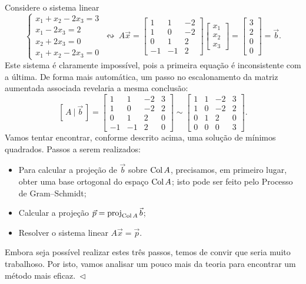 \documentclass[../livro.tex]{subfiles}  %
\begin{document}
\begin{example}\label{exp:minquad1}
  Considere o sistema linear
  \[
  \left\{
    \begin{array}{ll}
      x_1 + x_2 - 2x_3 = 3 \\
      x_1  - 2x_3 = 2 \\
      x_2 + 2x_3 = 0 \\
      x_1 + x_2 - 2x_3 = 0
    \end{array}
  \right. \ \leftrightsquigarrow  \
  A \vec{x} = \begin{bmatrix}
    1 & 1 & -2 \\ 1 & 0 & -2 \\ 0 & 1 & 2 \\ -1 & -1 & 2
  \end{bmatrix}
  \begin{bmatrix}
    x_1 \\ x_2 \\ x_3
  \end{bmatrix} =
  \begin{bmatrix}
    3 \\ 2 \\ 0 \\ 0
  \end{bmatrix} = \vec{b}.
  \] Este sistema é claramente impossível, pois a primeira equação é inconsistente com a última. De forma mais automática, um passo no escalonamento da matriz aumentada associada revelaria a mesma conclusão:
  \[
  [\, A \ | \ \vec{b} \, ] = \begin{bmatrix}
    1 & 1 & -2 & 3 \\ 1 & 0 & -2 & 2 \\ 0 & 1 & 2 & 0 \\ -1 & -1 & 2 & 0
  \end{bmatrix}   \sim
  \begin{bmatrix}
    1 & 1 & -2 & 3 \\ 1 & 0 & -2 & 2 \\ 0 & 1 & 2 & 0 \\ 0 & 0 & 0 & 3
  \end{bmatrix} .
  \] Vamos tentar encontrar, conforme descrito acima, uma solução de mínimos quadrados. Passos a serem realizados:
  \begin{itemize}
  \item Para calcular a projeção de $\vec{b}$ sobre $\operatorname{Col} A$, precisamos, em primeiro lugar, obter uma base ortogonal do espaço $\operatorname{Col} A$; isto pode ser feito pelo Processo de Gram--Schmidt;
  \item Calcular a projeção $\vec{p} = \operatorname{proj}_{\operatorname{Col} A} \vec{b}$;
  \item Resolver o sistema linear $A \vec{x} = \vec{p}$.
  \end{itemize} Embora seja possível realizar estes três passos, temos de convir que seria muito trabalhoso. Por isto, vamos analisar um pouco mais da teoria para encontrar um método mais eficaz$. \ \lhd$
\end{example}
\end{document}
